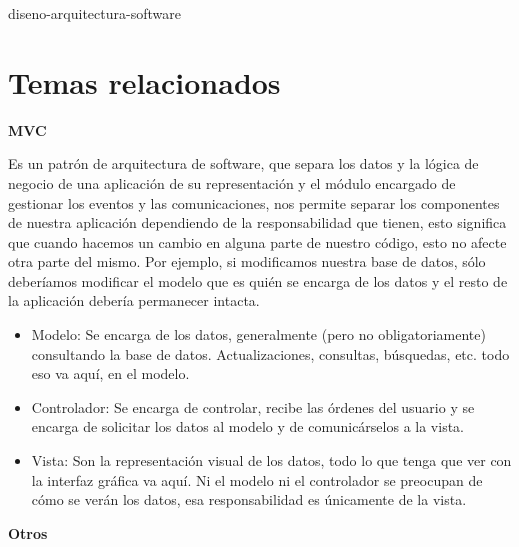 {diseno-arquitectura-software}

\newpage
\section{Temas relacionados}

\textbf{\large MVC}

 Es un patrón de arquitectura de software, que separa los datos y la lógica de negocio de una aplicación de su representación y el módulo encargado de gestionar los eventos y las comunicaciones, nos permite separar los componentes de nuestra aplicación dependiendo de la responsabilidad que tienen, esto significa que cuando hacemos un cambio en alguna parte de nuestro código, esto no afecte otra parte del mismo. Por ejemplo, si modificamos nuestra base de datos, sólo deberíamos modificar el modelo que es quién se encarga de los datos y el resto de la aplicación debería permanecer intacta. 
 
\begin{itemize}
    \item Modelo: Se encarga de los datos, generalmente (pero no obligatoriamente) consultando la base de datos. Actualizaciones, consultas, búsquedas, etc. todo eso va aquí, en el modelo.
    \item Controlador: Se encarga de controlar, recibe las órdenes del usuario y se encarga de solicitar los datos al modelo y de comunicárselos a la vista.
    \item Vista: Son la representación visual de los datos, todo lo que tenga que ver con la interfaz gráfica va aquí. Ni el modelo ni el controlador se preocupan de cómo se verán los datos, esa responsabilidad es únicamente de la vista.
\end{itemize}


\textbf{\large Otros}

